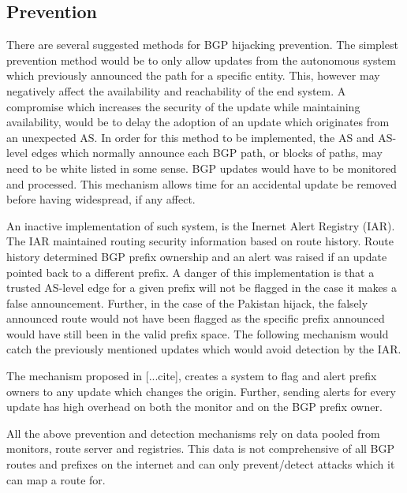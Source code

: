  \subsection{Prevention}
 There are several suggested methods for BGP hijacking prevention. The simplest prevention method would be to only allow updates from the autonomous system which previously announced the path for a specific entity. This, however may negatively affect the availability and reachability of the end system. A compromise which increases the security of the update while maintaining availability, would be to delay the adoption of an update which originates from an unexpected AS. In order for this method to be implemented, the AS and AS-level edges which normally announce each BGP path, or blocks of paths, may need to be white listed in some sense. BGP updates would have to be monitored and processed. This mechanism allows time for an accidental update be removed before having widespread, if any affect. 
 
An inactive implementation of such system, is the Inernet Alert Registry (IAR). The IAR  maintained routing security information based on route history. Route history determined BGP prefix ownership and an alert was raised if an update pointed back to a different prefix. A danger of this implementation is that a trusted AS-level edge for a given prefix will not be flagged in the case it makes a false announcement. Further, in the case of the Pakistan hijack, the falsely announced route would not have been flagged as the specific prefix announced would have still been in the valid prefix space. The following mechanism would catch the previously mentioned updates which would avoid detection by the IAR.

The mechanism proposed in [...cite], creates a system to flag and alert prefix owners to any update which changes the origin. Further, sending alerts for every update has high overhead on both the monitor and on the BGP prefix owner.  

All the above prevention and detection mechanisms rely on data pooled from monitors, route server and registries. This data is not comprehensive of all BGP routes and prefixes on the internet and can only prevent/detect attacks which it can map a route for.
 
 